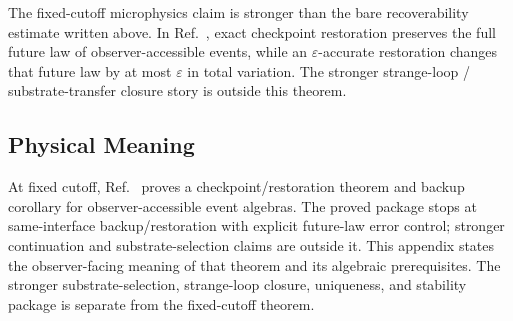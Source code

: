 The fixed-cutoff microphysics claim is stronger than the bare recoverability estimate written
above. In Ref.~\cite{ophmicrophysics}, exact checkpoint restoration preserves the full future
law of observer-accessible events, while an \(\varepsilon\)-accurate restoration changes that
future law by at most \(\varepsilon\) in total variation. The stronger strange-loop / substrate-transfer closure story
is outside this theorem.

\subsection{Physical Meaning}

At fixed cutoff, Ref.~\cite{ophmicrophysics} proves a checkpoint/restoration theorem and backup
corollary for observer-accessible event algebras. The proved package stops at same-interface
backup/restoration with explicit future-law error control; stronger continuation and
substrate-selection claims are outside it. This appendix states the observer-facing meaning
of that theorem and its algebraic prerequisites. The stronger substrate-selection, strange-loop
closure, uniqueness, and stability package is separate from the fixed-cutoff theorem.


